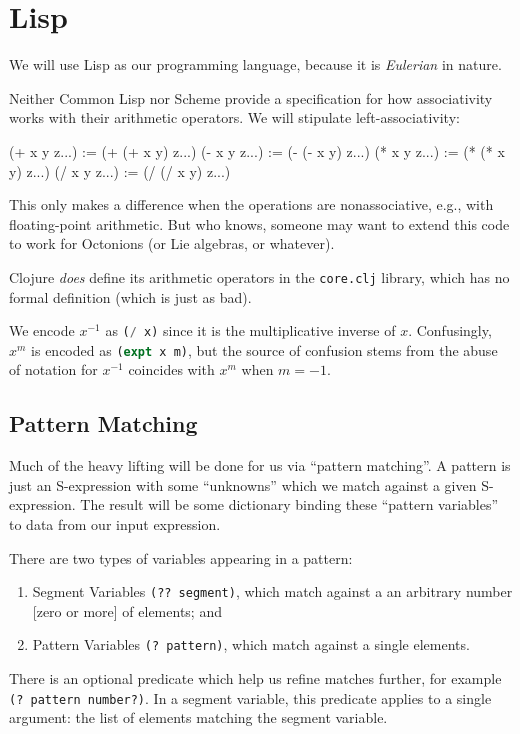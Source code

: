 \chapter{Lisp}

\M
We will use Lisp as our programming language, because it is
\emph{Eulerian} in nature.

Neither Common Lisp nor Scheme provide a specification for how
associativity works with their arithmetic operators. We will stipulate
left-associativity:

\begin{lisp-example}
(+ x y z...) := (+ (+ x y) z...)
(- x y z...) := (- (- x y) z...)
(* x y z...) := (* (* x y) z...)
(/ x y z...) := (/ (/ x y) z...)
\end{lisp-example}

\begin{remark}
This only makes a difference when the operations are nonassociative,
e.g., with floating-point arithmetic. But who knows, someone may want to
extend this code to work for Octonions (or Lie algebras, or whatever).
\end{remark}

\begin{remark}
Clojure \emph{does} define its arithmetic operators in the
\verb#core.clj# library, which has no formal definition (which is just
as bad).
\end{remark}

We encode $x^{-1}$ as \lstinline[language=lisp]{(/ x)} since it is the
multiplicative inverse of $x$. Confusingly, $x^{m}$ is encoded as
\lstinline[language=lisp]{(expt x m)}, but the source of confusion stems
from the abuse of notation for $x^{-1}$ coincides with $x^{m}$ when $m=-1$.

\section{Pattern Matching}

\M
Much of the heavy lifting will be done for us via ``pattern matching''.
A pattern is just an S-expression with some ``unknowns'' which we match
against a given S-expression. The result will be some dictionary binding
these ``pattern variables'' to data from our input expression.

There are two types of variables appearing in a pattern:
\begin{enumerate}
\item Segment Variables \lstinline[language=lisp]{(?? segment)}, which
  match against a an arbitrary number [zero or more] of elements; and
\item Pattern Variables \lstinline[language=lisp]{(? pattern)}, which match against a single elements.
\end{enumerate}
There is an optional predicate which help us refine matches further, for
example
\lstinline[language=lisp]{(? pattern number?)}. In a segment variable,
this predicate applies to a single argument: the list of elements
matching the segment variable.

